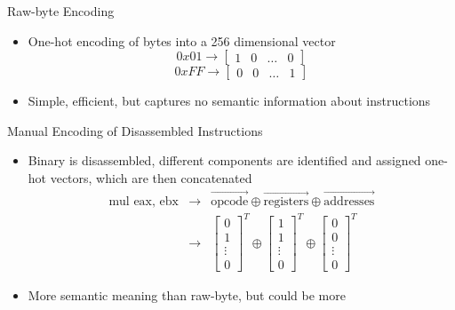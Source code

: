 \documentclass{beamer}
\begin{document}
\begin{frame}{Raw-byte Encoding}
	
	\begin{itemize}
		\item One-hot encoding of bytes into a 256 dimensional vector %
		$$0x01 \rightarrow \begin{bmatrix} 1 & 0 & \dots & 0 \end{bmatrix}$$
		$$0xFF \rightarrow \begin{bmatrix} 0 & 0 & \dots & 1 \end{bmatrix}$$
		\item Simple, efficient, but captures no semantic information about instructions
	\end{itemize}
	
\end{frame}

\begin{frame}{Manual Encoding of Disassembled Instructions}
	
	\begin{itemize}
		\item Binary is disassembled, different components are identified and assigned one-hot vectors, which are then concatenated
		\begin{eqnarray*}
			\textrm{mul eax, ebx} 
			&\rightarrow& \vec{\textrm{opcode}} \oplus \vec{\textrm{registers}} \oplus \vec{\textrm{addresses}} \\
			&\rightarrow& \begin{bmatrix} 0 \\ 1 \\ \vdots \\ 0 \end{bmatrix}^T \oplus \begin{bmatrix} 1 \\ 1 \\ \vdots \\ 0 \end{bmatrix}^T \oplus \begin{bmatrix} 0 \\ 0 \\ \vdots \\ 0 \end{bmatrix}^T %
		\end{eqnarray*}
		\item More semantic meaning than raw-byte, but could be more
	\end{itemize}
	
\end{frame}
\end{document}
